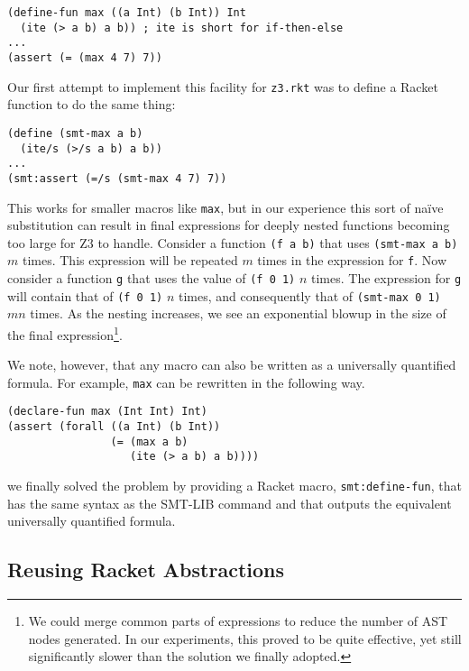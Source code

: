 \begin{verbatim}
(define-fun max ((a Int) (b Int)) Int
  (ite (> a b) a b)) ; ite is short for if-then-else
...
(assert (= (max 4 7) 7))
\end{verbatim}

Our first attempt to implement this facility for \texttt{z3.rkt} was to define
a Racket function to do the same thing:

\begin{verbatim}
(define (smt-max a b)
  (ite/s (>/s a b) a b))
...
(smt:assert (=/s (smt-max 4 7) 7))
\end{verbatim}

This works for smaller macros like \texttt{max}, but in our experience this
sort of na\"{i}ve substitution can result in final expressions for deeply
nested functions becoming too large for Z3 to handle. Consider a function
\texttt{(f a b)} that uses \texttt{(smt-max a b)} $m$ times. This expression
will be repeated $m$ times in the expression for \texttt{f}. Now consider a
function \texttt{g} that uses the value of \texttt{(f 0 1)} $n$ times. The
expression for \texttt{g} will contain that of \texttt{(f 0 1)} $n$ times, and
consequently that of \texttt{(smt-max 0 1)} $m n$ times. As the nesting
increases, we see an exponential blowup in the size of the final
expression\footnote{We could merge common parts of expressions to reduce the
number of AST nodes generated. In our experiments, this proved to be quite
effective, yet still significantly slower than the solution we finally
adopted.}.

We note, however, that any macro can also be written as a universally
quantified formula. For example, \texttt{max} can be rewritten in the
following way.

\begin{verbatim}
(declare-fun max (Int Int) Int)
(assert (forall ((a Int) (b Int))
                (= (max a b)
                   (ite (> a b) a b))))
\end{verbatim}

  we  finally solved  the  problem   by providing a Racket macro,
\texttt{smt:define-fun},  that  has the  same  syntax as  the
SMT-LIB command  and that outputs  the equivalent universally
quantified formula.

\subsection{Reusing Racket Abstractions}

